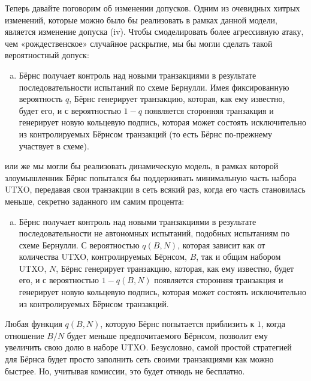 \documentclass{mrl}
\begin{document}
Теперь давайте поговорим об изменении допусков. Одним из очевидных хитрых изменений, которые можно было бы реализовать в рамках данной модели, является изменение допуска (iv). Чтобы смоделировать более агрессивную атаку, чем «рождественское» случайное раскрытие, мы бы могли сделать такой вероятностный допуск:
\begin{enumerate}[(v)]
\item Бёрнс получает контроль над новыми транзакциями в результате последовательности испытаний по схеме Бернулли. Имея фиксированную вероятность $q$, Бёрнс генерирует транзакцию, которая, как ему известно, будет его, и с вероятностью $1-q$ появляется сторонняя транзакция и генерирует новую кольцевую подпись, которая может состоять исключительно из контролируемых Бёрнсом транзакций (то есть Бёрнс по-прежнему участвует в схеме).
\end{enumerate}
или же мы могли бы реализовать динамическую модель, в рамках которой злоумышленник Бёрнс попытался бы поддерживать минимальную часть набора UTXO, передавая свои транзакции в сеть всякий раз, когда его часть становилась меньше, секретно заданного им самим процента:
\begin{enumerate}[(v)]
\item Бёрнс получает контроль над новыми транзакциями в результате последовательности не автономных испытаний, подобных испытаниям по схеме Бернулли. С вероятностью $q(B,N)$, которая зависит как от количества UTXO, контролируемых Бёрнсом, $B$, так и общим набором UTXO, $N$, Бёрнс генерирует транзакцию, которая, как ему известно, будет его, и с вероятностью $1-q(B,N)$ появляется сторонняя транзакция и генерирует новую кольцевую подпись, которая может состоять исключительно из контролируемых Бёрнсом транзакций.
\end{enumerate}
Любая функция $q(B,N)$, которую Бёрнс попытается приблизить к $1$, когда отношение $B/N$ будет меньше предпочитаемого Бёрнсом, позволит ему увеличить свою долю в наборе UTXO. Безусловно, самой простой стратегией для Бёрнса будет просто заполнить сеть своими транзакциями как можно быстрее. Но, учитывая комиссии, это будет отнюдь не бесплатно.
\end{document}
